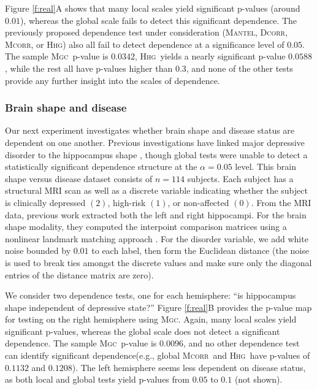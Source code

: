 \documentclass[11pt]{article}
\providecommand{\sct}[1]{{\normalfont\textsc{#1}}}
\newcommand{\Mgc}{\sct{Mgc}}
\newcommand{\Hhg}{\sct{Hhg}}
\newcommand{\Dcorr}{\sct{Dcorr}}
\newcommand{\Mcorr}{\sct{Mcorr}}
\newcommand{\Mantel}{\sct{Mantel}}
\begin{document}
Figure \ref{f:real}{\color{magenta}A}  shows that many local scales yield significant p-values (around $0.01$), whereas the global scale fails to detect this significant dependence. The previously proposed dependence test under consideration (\Mantel, \Dcorr, \Mcorr, or \Hhg) also all fail to detect dependence at a significance level of $0.05$. The sample \Mgc~p-value is $0.0342$, \Hhg~yields a nearly significant p-value $0.0588$, while the rest all have p-values higher than $0.3$, and none of the other tests provide any further insight into the scales of dependence.


\subsubsection*{Brain shape and disease} %


Our next experiment investigates whether brain shape and disease status are dependent on one another.  Previous investigations have linked major depressive disorder to the hippocampus shape \cite{ParkEtAl2008,PosenerEtAl2003}, though global tests were unable to detect a statistically significant dependence structure at the $\alpha=0.05$ level.
%
This brain shape versus disease dataset consists of $n=114$ subjects. Each subject has a structural MRI scan as well as a discrete variable indicating whether the subject is clinically depressed $(2)$, high-risk $(1)$, or non-affected $(0)$.  From the MRI data, previous work  extracted both the left and right hippocampi.   For the brain shape modality, they computed the interpoint comparison matrices using a nonlinear landmark matching approach \cite{ParkEtAl2008,BegEtAl2005}. For the  disorder variable, we add white noise bounded by $0.01$ to each label, then form the Euclidean distance (the noise is used to break ties amongst the discrete values and make sure only the diagonal entries of the distance matrix are zero).

We consider two dependence tests, one for each hemisphere: ``is hippocampus shape independent of depressive state?''
Figure \ref{f:real}{\color{magenta}B} provides the p-value map for testing on the right hemisphere using \Mgc. Again, many local scales yield significant p-values, whereas the global scale does not detect a significant dependence. The sample \Mgc~p-value is $0.0096$, and no other dependence test can identify significant dependence(e.g., global \Mcorr~and \Hhg~have p-values of $0.1132$ and $0.1208$). The left hemisphere seems less dependent on disease status, as both local and global tests yield p-values from $0.05$ to $0.1$ (not shown). 
\end{document}
